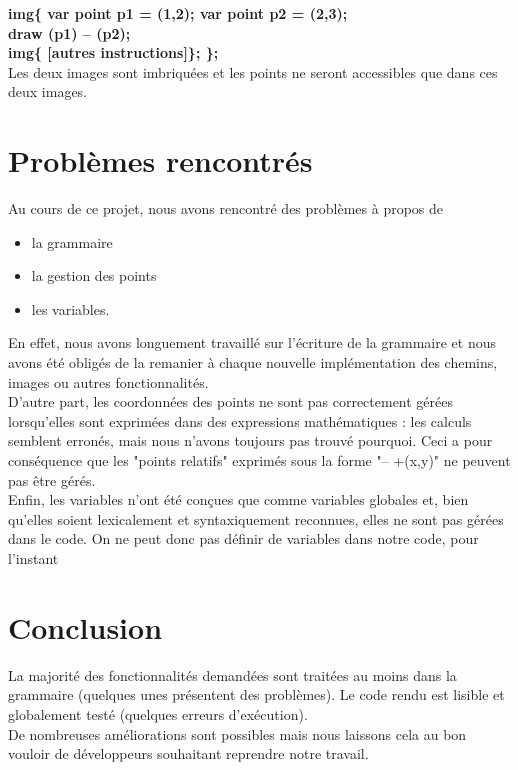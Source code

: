 \documentclass[a4paper, 12pt]{report}
\begin{document}
\textbf{
img\{ var point p1 = (1,2); var point p2 = (2,3);\\
draw (p1) -- (p2);\\
img\{ [autres instructions]\};
\};
}\\

Les deux images sont imbriquées et les points ne seront accessibles que dans ces deux images.

\newpage
\section{Problèmes rencontrés}

Au cours de ce projet, nous avons rencontré des problèmes à propos de 
\begin{itemize}
\item la grammaire
\item la gestion des points
\item les variables. 
\end{itemize}
En effet, nous avons longuement travaillé sur l'écriture de la grammaire et nous avons été obligés de la remanier à chaque nouvelle implémentation des chemins, images ou autres fonctionnalités.\\
D'autre part, les coordonnées des points ne sont pas correctement gérées lorsqu'elles sont exprimées dans des expressions mathématiques : les calculs semblent erronés, mais nous n'avons toujours pas trouvé pourquoi. Ceci a pour conséquence que les "points relatifs" exprimés sous la forme "-- +(x,y)" ne peuvent pas être gérés.\\
Enfin, les variables n'ont été conçues que comme variables globales et, bien qu'elles soient lexicalement et syntaxiquement reconnues, elles ne sont pas gérées dans le code. On ne peut donc pas définir de variables dans notre code, pour l'instant


\section{Conclusion}
La majorité des fonctionnalités demandées sont traitées au moins dans la grammaire (quelques unes présentent des problèmes). Le code rendu est lisible et globalement testé (quelques erreurs d'exécution). \\
De nombreuses améliorations sont possibles mais nous laissons cela au bon vouloir de développeurs souhaitant reprendre notre travail.
\end{document}
